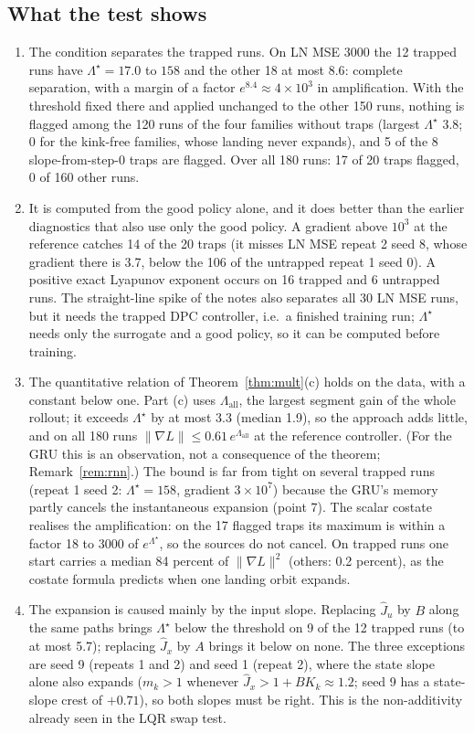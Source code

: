 \documentclass[11pt]{article}
\theoremstyle{plainnote}
\newcommand{\Jx}{\hat J_x}
\newcommand{\Ju}{\hat J_u}
\begin{document}
\subsection{What the test shows}
\begin{enumerate}
\item The condition separates the trapped runs. On LN MSE 3000 the 12 trapped runs have $\Lambda^\star=17.0$ to $158$ and the other 18 at most $8.6$: complete separation, with a margin of a factor $e^{8.4}\approx4\times10^3$ in amplification. With the threshold fixed there and applied unchanged to the other 150 runs, nothing is flagged among the 120 runs of the four families without traps (largest $\Lambda^\star$ 3.8; 0 for the kink-free families, whose landing never expands), and 5 of the 8 slope-from-step-0 traps are flagged. Over all 180 runs: 17 of 20 traps flagged, 0 of 160 other runs.
\item It is computed from the good policy alone, and it does better than the earlier diagnostics that also use only the good policy. A gradient above $10^3$ at the reference catches 14 of the 20 traps (it misses LN MSE repeat 2 seed 8, whose gradient there is 3.7, below the 106 of the untrapped repeat 1 seed 0). A positive exact Lyapunov exponent occurs on 16 trapped and 6 untrapped runs. The straight-line spike of the notes also separates all 30 LN MSE runs, but it needs the trapped DPC controller, i.e.\ a finished training run; $\Lambda^\star$ needs only the surrogate and a good policy, so it can be computed before training.
\item The quantitative relation of Theorem~\ref{thm:mult}(c) holds on the data, with a constant below one. Part (c) uses $\Lambda_{\mathrm{all}}$, the largest segment gain of the whole rollout; it exceeds $\Lambda^\star$ by at most 3.3 (median 1.9), so the approach adds little, and on all 180 runs $\|\nabla L\|\le0.61\,e^{\Lambda_{\mathrm{all}}}$ at the reference controller. (For the GRU this is an observation, not a consequence of the theorem; Remark~\ref{rem:rnn}.) The bound is far from tight on several trapped runs (repeat 1 seed 2: $\Lambda^\star=158$, gradient $3\times10^7$) because the GRU's memory partly cancels the instantaneous expansion (point 7). The scalar costate realises the amplification: on the 17 flagged traps its maximum is within a factor 18 to 3000 of $e^{\Lambda^\star}$, so the sources do not cancel. On trapped runs one start carries a median 84 percent of $\|\nabla L\|^2$ (others: 0.2 percent), as the costate formula predicts when one landing orbit expands.
\item The expansion is caused mainly by the input slope. Replacing $\Ju$ by $B$ along the same paths brings $\Lambda^\star$ below the threshold on 9 of the 12 trapped runs (to at most 5.7); replacing $\Jx$ by $A$ brings it below on none. The three exceptions are seed 9 (repeats 1 and 2) and seed 1 (repeat 2), where the state slope alone also expands ($m_k>1$ whenever $\Jx>1+BK_k\approx1.2$; seed 9 has a state-slope crest of $+0.71$), so both slopes must be right. This is the non-additivity already seen in the LQR swap test.

\end{enumerate}
\end{document}
